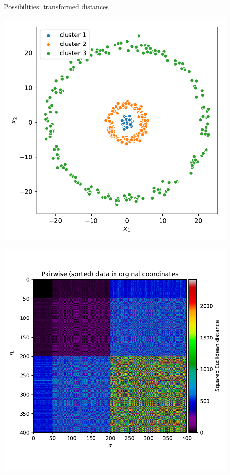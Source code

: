 \begin{frame}{Possibilities: transformed distances}

\begin{center}
\begin{minipage}{0.99\textwidth}
	\begin{center}
	\begin{minipage}{0.35\textwidth}
		\includegraphics[width=0.9\textwidth]{img/m3_circ_data} 
	\end{minipage}
	\begin{minipage}{0.35\textwidth}
		\includegraphics[width=0.9\textwidth]{img/m3_circ_pdist} 
	\end{minipage}
	\end{center}
\end{minipage}
\end{center}


\end{frame}
